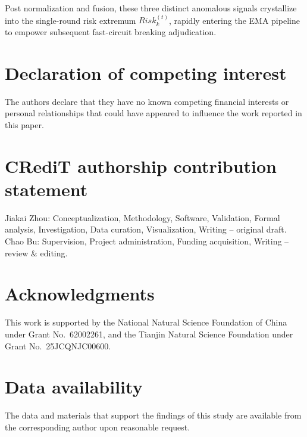 \documentclass[final,5p,times,twocolumn]{elsarticle/elsarticle}
\begin{document}
Post normalization and fusion, these three distinct anomalous signals crystallize into the single-round risk extremum $Risk_{k}^{(t)}$, rapidly entering the EMA pipeline to empower subsequent fast-circuit breaking adjudication.

\section*{Declaration of competing interest}
The authors declare that they have no known competing financial interests or personal relationships that could have appeared to influence the work reported in this paper.

\section*{CRediT authorship contribution statement}
Jiakai Zhou: Conceptualization, Methodology, Software, Validation, Formal analysis, Investigation, Data curation, Visualization, Writing -- original draft. Chao Bu: Supervision, Project administration, Funding acquisition, Writing -- review \& editing.

\section*{Acknowledgments}
This work is supported by the National Natural Science Foundation of China under Grant No.~62002261, and the Tianjin Natural Science Foundation under Grant No.~25JCQNJC00600.

\section*{Data availability}
The data and materials that support the findings of this study are available from the corresponding author upon reasonable request.
\end{document}
